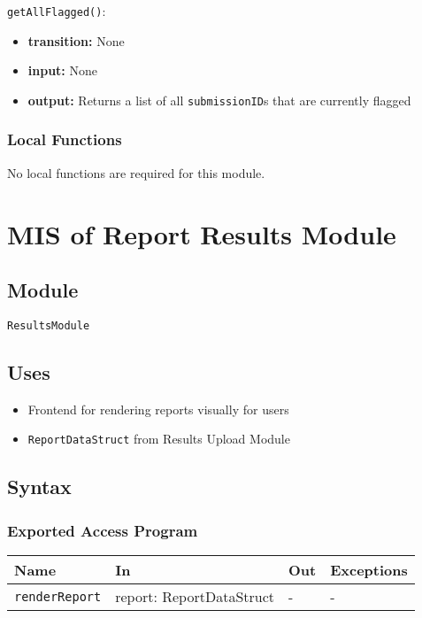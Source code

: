 \documentclass[12pt, titlepage]{article}
\begin{document}
\noindent \texttt{getAllFlagged()}:
\begin{itemize}
    \item \textbf{transition:} None
    \item \textbf{input:} None
    \item \textbf{output:} Returns a list of all \texttt{submissionID}s that are currently flagged
\end{itemize}

\subsubsection{Local Functions}
No local functions are required for this module.


\section{MIS of Report Results Module} \label{ResultsModule}

\subsection{Module}

\texttt{ResultsModule}

\subsection{Uses}

\begin{itemize}
    \item Frontend for rendering reports visually for users
    \item \texttt{ReportDataStruct} from Results Upload Module
\end{itemize}

\subsection{Syntax}

\subsubsection{Exported Access Program}

\begin{center}
\begin{tabular}{p{5cm} p{4cm} p{3.5cm} p{2cm}}
\hline
\textbf{Name} & \textbf{In} & \textbf{Out} & \textbf{Exceptions} \\
\hline
\texttt{renderReport} & report: ReportDataStruct & - & - \\
\hline
\end{tabular}
\end{center}
\end{document}
